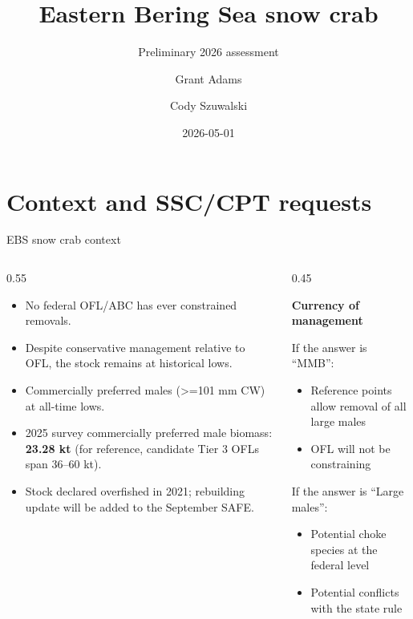 \documentclass[
  10pt,
  ignorenonframetext,
  aspectratio=169,
]{beamer}
\title{Eastern Bering Sea snow crab}
\subtitle{Preliminary 2026 assessment}
\author{Grant Adams \and Cody Szuwalski}
\date{2026-05-01}
\institute{NOAA Alaska Fisheries Science Center}
\providecommand{\tightlist}{%
  \setlength{\itemsep}{0pt}\setlength{\parskip}{0pt}}
\begin{document}
\frame{\titlepage}


\section{Context and SSC/CPT
requests}\label{context-and-ssccpt-requests}

\begin{frame}{EBS snow crab context}
\label{ebs-snow-crab-context}
\begin{columns}[T]
\begin{column}{0.55\linewidth}
\begin{itemize}
\item
  No federal OFL/ABC has ever constrained removals.
\item
  Despite conservative management relative to OFL, the stock remains at
  historical lows.
\item
  Commercially preferred males (\textgreater=101 mm CW) at all-time
  lows.
\item
  2025 survey commercially preferred male biomass: \textbf{23.28 kt}
  (for reference, candidate Tier 3 OFLs span 36--60 kt).
\item
  Stock declared overfished in 2021; rebuilding update will be added to
  the September SAFE.
\end{itemize}
\end{column}

\begin{column}{0.45\linewidth}
\centering
\small

\textbf{Currency of management}

If the answer is ``MMB'':

\begin{itemize}
\tightlist
\item
  Reference points allow removal of all large males
\item
  OFL will not be constraining
\end{itemize}

If the answer is ``Large males'':

\begin{itemize}
\tightlist
\item
  Potential choke species at the federal level
\item
  Potential conflicts with the state rule
\end{itemize}
\end{column}
\end{columns}
\end{frame}
\end{document}
